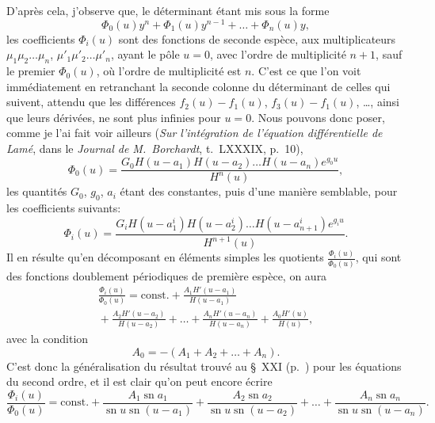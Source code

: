 \documentclass[11pt,leqno,oneside,letterpaper]{book}[2005/09/16]
\DeclareMathOperator{\sn}{sn}
\begin{document}
D'apr\`es cela, j'observe que, le d\'eterminant \'etant mis sous la forme
\[
\Phi_0(u)y^n+\Phi_1(u)y^{n-1}+\ldots+\Phi_n(u)y,
\]
les coefficients $\Phi_i(u)$ sont des fonctions de seconde esp\`ece, aux multiplicateurs
$\mu_1\mu_2\ldots\mu_n$, $\mu'_1\mu'_2\ldots\mu'_n$, ayant le p\^ole $u = 0$, avec l'ordre de
multiplicit\'e $n + 1$, sauf le premier $\Phi_0(u)$, o\`u l'ordre de multiplicit\'e est $n$.
C'est ce que l'on voit imm\'ediatement en retranchant la seconde colonne
du d\'eterminant de celles qui suivent, attendu que les diff\'erences $f_2(u)-f_1(u)$,
$f_3(u)-f_1(u)$, \ldots, ainsi que leurs d\'eriv\'ees, ne sont plus infinies pour $u = 0$.
Nous pouvons donc poser, comme je l'ai fait voir ailleurs (\textit{Sur l'int\'egration
de l'\'equation diff\'erentielle de Lam\'e}, dans le \textit{Journal de M.~Borchardt},
t.~LXXXIX, p.~10),
\[
\Phi_0(u)=\frac{G_0H(u-a_1)H(u-a_2)\ldots H(u-a_n)e^{g_0u}}{H^n(u)},
\]
les quantit\'es $G_0$, $g_0$, $a_i$ \'etant des constantes, puis d'une mani\`ere semblable,
pour les coefficients suivants:
\[
\Phi_i(u)=\frac{G_iH(u-a^i_1)H(u-a^i_2)\ldots H(u-a^i_{n+1})e^{g_iu}}{H^{n+1}(u)}.
\]
Il en r\'esulte qu'en d\'ecomposant en \'el\'ements simples les quotients $\frac{\Phi_i(u)}{\Phi_0(u)}$,
qui sont des fonctions doublement p\'eriodiques de premi\`ere esp\`ece, on aura
\begin{multline*}
\frac{\Phi_i(u)}{\Phi_0(u)} = \text{const.} +
\frac{A_1 H'(u-a_1) }{ H(u-a_1) } \\ {}+
\frac{A_2 H'(u-a_2) }{ H(u-a_2) } + \ldots +
\frac{A_n H'(u-a_n) }{ H(u-a_n) } +
\frac{A_0 H'(u    ) }{ H(u    ) } ,
\end{multline*}
avec la condition
\[
  A_0 = -(A_1 + A_2 + \ldots + A_n).
\]
C'est donc la g\'en\'eralisation du r\'esultat trouv\'e
au \S~XXI (p.~\pageref{page106}) %
pour les \'equations du second ordre, et il est clair qu'on peut
encore \'ecrire
\[
\frac{\Phi_i(u)}{\Phi_0(u)} = \text{const.} +
\frac{A_1 \sn a_1 }{\sn u \sn(u-a_1) } +
\frac{A_2 \sn a_2 }{\sn u \sn(u-a_2) } + \ldots +
\frac{A_n \sn a_n }{\sn u \sn(u-a_n) } .
\]
\end{document}
